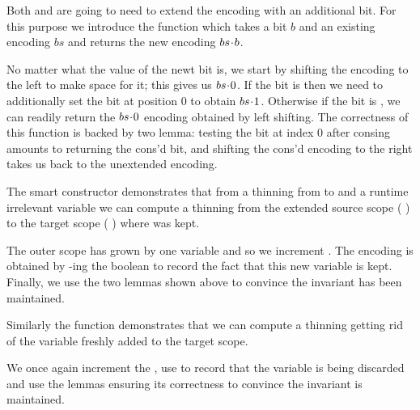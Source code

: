 
Both  and  are going to need to extend the
encoding with an additional bit.
%
For this purpose we introduce the  function which takes a bit
$b$ and an existing encoding $bs$ and returns the new encoding $bs\!\cdot{}\!b$.


No matter what the value of the newt bit is, we start by shifting the encoding to
the left to make space for it; this gives us $bs\!\cdot{}\!0$.
%
If the bit is  then we need to additionally set the bit at position
$0$ to obtain $bs\!\cdot{}\!1$. Otherwise if the bit is , we can readily
return the $bs\!\cdot{}\!0$ encoding obtained by left shifting.
%
The correctness of this function is backed by two lemma:
testing the bit at index $0$ after consing amounts to returning the cons'd bit,
and shifting the cons'd encoding to the right takes us back to the unextended
encoding.


The  smart constructor demonstrates that from a thinning from
 to  and a runtime irrelevant variable 
we can compute a thinning from the extended source scope
( \IdrisData{:<} ) to the target scope
( \IdrisData{:<} ) where  was kept.


The outer scope has grown by one variable and so we increment .
%
The encoding is obtained by -ing the boolean  to
record the fact that this new variable is kept.
%
Finally, we use the two lemmas shown above to convince \idris{} the invariant
has been maintained.

Similarly the  function demonstrates that we can compute a
thinning getting rid of the variable  freshly added to the target
scope.


We once again increment the , use  to
record that the variable is being discarded and use the lemmas ensuring its
correctness to convince \idris{} the invariant is maintained.

